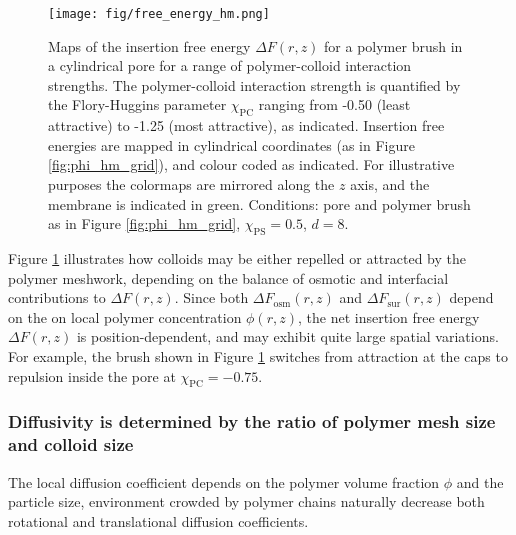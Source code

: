 \documentclass[12pt, a4paper]{article}
\begin{document}
\begin{figure}
    \centering
    \texttt{[image: fig/free\_energy\_hm.png]}
    \caption{
    Maps of the insertion free energy $\Delta F(r,z)$ for a polymer brush in a cylindrical pore for a range of polymer-colloid interaction strengths. 
    The polymer-colloid interaction strength is quantified by the Flory-Huggins parameter $\chi_{\text{PC}}$ ranging from -0.50 (least attractive) to -1.25 (most attractive), as indicated. 
    Insertion free energies are mapped in cylindrical coordinates (as in Figure \ref{fig:phi_hm_grid}), and colour coded as indicated. 
    For illustrative purposes the colormaps are mirrored along the $z$ axis, and the membrane is indicated in green. 
    Conditions: pore and polymer brush as in Figure \ref{fig:phi_hm_grid}, $\chi_{\text{PS}}=0.5$, $d=8$.
    }
    \label{fig:DeltaF_map}
\end{figure}

Figure \ref{fig:DeltaF_map} illustrates how colloids may be either repelled or attracted by the polymer meshwork, 
depending on the balance of osmotic and interfacial contributions to $\Delta F(r,z)$. 
Since both $\Delta F_{\text{osm}}(r,z)$ and $\Delta F_{\text{sur}}(r,z)$ depend on the on local polymer concentration $\phi(r,z)$, 
the net insertion free energy $\Delta F(r,z)$ is position-dependent, and may exhibit quite large spatial variations. 
For example, the brush shown in Figure \ref{fig:DeltaF_map} switches from attraction at the caps to repulsion inside the pore at $\chi_{\text{PC}}=-0.75$.


\subsubsection{Diffusivity is determined by the ratio of polymer mesh size and colloid size}
The local diffusion coefficient depends on the polymer volume fraction $\phi$ and the particle size, environment crowded by polymer chains naturally decrease both rotational \cite{Fu2017} and translational \cite{Stewart1998} diffusion coefficients.

\end{document}
